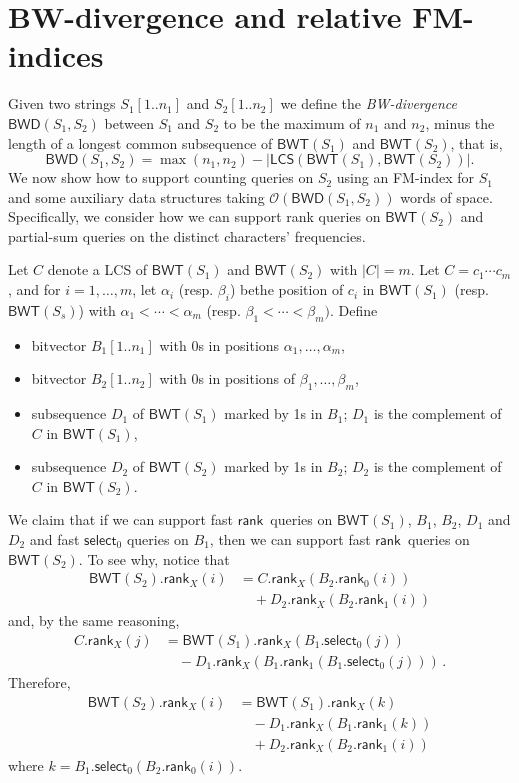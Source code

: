\documentclass{llncs}
\newcommand{\Oh}[1]
  {\ensuremath{\mathcal{O}\!\left( {#1} \right)}}
\newcommand{\LCS}
  {\ensuremath{\mathsf{LCS}}}
\newcommand{\BWD}
  {\ensuremath{\mathsf{BWD}}}
\newcommand{\BWT}
  {\ensuremath{\mathsf{BWT}}}
\newcommand{\rank}
  {\ensuremath{\mathsf{rank}}}
\newcommand{\select}
  {\ensuremath{\mathsf{select}}}
\begin{document}
\section{BW-divergence and relative FM-indices} \label{sec:BWdiv}

Given two strings \(S_1 [1..n_1]\) and \(S_2 [1..n_2]\) we define the {\em
BW-divergence\/} \(\BWD (S_1, S_2)\) between $S_1$ and $S_2$ to be the
maximum of $n_1$ and $n_2$, minus the length of a longest common subsequence
of $\BWT (S_1)$ and $\BWT (S_2)$, that is,
\begin{equation}\label{eq:BWDdef}
\BWD(S_1, S_2) = \max(n_1,n_2) - |\LCS(\BWT (S_1),\BWT (S_2))|.
\end{equation}
We now show how to support counting queries on $S_2$ using an FM-index for
$S_1$ and some auxiliary data structures taking $\Oh{\BWD (S_1, S_2)}$ words
of space. Specifically, we consider how we can support rank queries on \(\BWT
(S_2)\) and partial-sum queries on the distinct characters' frequencies.

Let $C$ denote a LCS of $\BWT (S_1)$ and $\BWT(S_2)$ with $|C|=m$. Let $C=c_1
\cdots c_m$, and for $i=1,\ldots,m$, let $\alpha_i$ (resp. $\beta_i$) bethe
position of $c_i$ in $\BWT(S_1)$ (resp. $\BWT(S_s)$) with $\alpha_1 < \cdots
< \alpha_{m}$ (resp. $\beta_1 < \cdots < \beta_{m})$. Define
\begin{itemize}
\item bitvector \(B_1 [1..n_1]\) with 0s in positions  $\alpha_1, \ldots,
    \alpha_m$,
\item bitvector \(B_2 [1..n_2]\) with 0s in positions of $\beta_1,
    \ldots, \beta_m$,
\item subsequence $D_1$ of \(\BWT (S_1)\) marked by 1s in $B_1$; $D_1$ is
    the complement of $C$ in $\BWT (S_1)$,
\item subsequence $D_2$ of \(\BWT (S_2)\) marked by 1s in $B_2$; $D_2$ is
    the complement of $C$ in $\BWT (S_2)$.
\end{itemize}

We claim that if we can support fast \rank\ queries on \(\BWT (S_1)\), $B_1$,
$B_2$, $D_1$ and $D_2$ and fast $\select_0$ queries on $B_1$, then we can
support fast \rank\ queries on \(\BWT (S_2)\). To see why, notice that
\begin{align*}
\BWT (S_2).\rank_X (i)
& = C.\rank_X (B_2.\rank_0 (i))\\
& \quad + D_2.\rank_X (B_2.\rank_1 (i))
\end{align*}
and, by the same reasoning,
\begin{align*}
C.\rank_X (j)
& = \BWT (S_1).\rank_X (B_1.\select_0 (j))\\
& \quad - D_1.\rank_X (B_1.\rank_1 (B_1.\select_0 (j)))\,.
\end{align*}
Therefore,
\begin{align*}
\BWT (S_2).\rank_X (i)
& = \BWT (S_1).\rank_X (k)\\
& \quad - D_1.\rank_X (B_1.\rank_1 (k))\\
& \quad + D_2.\rank_X (B_2.\rank_1 (i))
\end{align*}
where \(k = B_1.\select_0 (B_2.\rank_0 (i))\).
\end{document}

